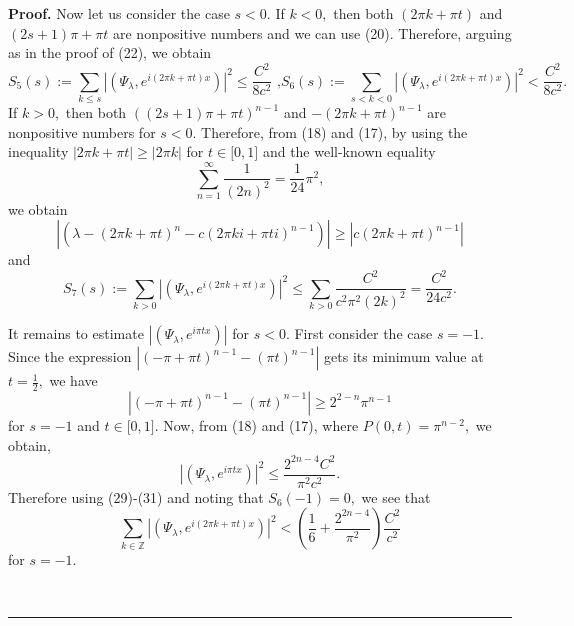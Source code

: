 \documentclass{article}%
\newenvironment{proof}[1][Proof]{\textbf{#1.} }{\ \rule{0.5em}{0.5em}}
\begin{document}
\begin{proof}
Now let us consider the case $s<0.$ If $k<0,$ then both $(2\pi k+\pi t)$ and
$(2s+1)\pi+\pi t$ are nonpositive numbers and we can use (20). Therefore,
arguing as in the proof of (22), we obtain
\begin{equation}
S_{5}(s):=\sum_{k\leq s}\left\vert \left(  \Psi_{\lambda},e^{i\left(  2\pi
k+\pi t\right)  x}\right)  \right\vert ^{2}\leq\frac{C^{2}}{8c^{2}}\text{ ,
}S_{6}(s):=\sum_{s<k<0}\left\vert \left(  \Psi_{\lambda},e^{i\left(  2\pi
k+\pi t\right)  x}\right)  \right\vert ^{2}<\frac{C^{2}}{8c^{2}}.\tag{29}%
\end{equation}
If $k>0,$ then both $((2s+1)\pi+\pi t)^{n-1}$ and $-(2\pi k+\pi t)^{n-1}$ are
nonpositive numbers for $s<0.$ Therefore, from (18) and (17), by using the
inequality $\left\vert 2\pi k+\pi t\right\vert \geq\left\vert 2\pi
k\right\vert $ for $t\in\lbrack0,1]$ and the well-known equality
\[
\sum_{n=1}^{\infty}\frac{1}{(2n)^{2}}=\frac{1}{24}\pi^{2},
\]
we obtain%
\[
\left\vert \left(  \lambda-\left(  2\pi k+\pi t\right)  ^{n}-c(2\pi ki+\pi
ti)^{n-1}\right)  \right\vert \geq\left\vert c(2\pi k+\pi t)^{n-1}\right\vert
\]
and
\begin{equation}
S_{7}(s):=\sum_{k>0}\left\vert \left(  \Psi_{\lambda},e^{i\left(  2\pi k+\pi
t\right)  x}\right)  \right\vert ^{2}\leq\sum_{k>0}\frac{C^{2}}{c^{2}\pi
^{2}(2k)^{2}}=\frac{C^{2}}{24c^{2}}.\tag{30}%
\end{equation}


It remains to estimate $\left\vert \left(  \Psi_{\lambda},e^{i\pi tx}\right)
\right\vert $ for $s<0.$ First consider the case $s=-1.$ Since the expression
$\left\vert (-\pi+\pi t)^{n-1}-(\pi t)^{n-1}\right\vert $ gets its minimum
value at $t=\frac{1}{2},$ we have
\[
\left\vert (-\pi+\pi t)^{n-1}-(\pi t)^{n-1}\right\vert \geq2^{2-n}\pi^{n-1}%
\]
for $s=-1$ and $t\in\lbrack0,1].$ Now, from (18) and (17), where
$P(0,t)=\pi^{n-2},$ we obtain, \
\begin{equation}
\left\vert \left(  \Psi_{\lambda},e^{i\pi tx}\right)  \right\vert ^{2}%
\leq\frac{2^{2n-4}C^{2}}{\pi^{2}c^{2}}. \tag{31}%
\end{equation}
Therefore using (29)-(31) and noting that $S_{6}(-1)=0,$ we see that
\begin{equation}
\sum_{k\in\mathbb{Z}}\left\vert \left(  \Psi_{\lambda},e^{i\left(  2\pi k+\pi
t\right)  x}\right)  \right\vert ^{2}<\left(  \frac{1}{6}+\frac{2^{2n-4}}%
{\pi^{2}}\right)  \frac{C^{2}}{c^{2}} \tag{32}%
\end{equation}
for $s=-1.$


\end{proof}
\end{document}
